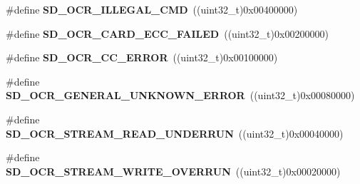 \begin{DoxyCompactItemize}
\item 
\#define {\bfseries S\+D\+\_\+\+O\+C\+R\+\_\+\+I\+L\+L\+E\+G\+A\+L\+\_\+\+C\+MD}~((uint32\+\_\+t)0x00400000)\hypertarget{group___s_t_m324x_g___e_v_a_l___s_d_i_o___s_d___private___defines_gaacbea47f6b504f11a696e9164d4eb7cd}{}\label{group___s_t_m324x_g___e_v_a_l___s_d_i_o___s_d___private___defines_gaacbea47f6b504f11a696e9164d4eb7cd}

\item 
\#define {\bfseries S\+D\+\_\+\+O\+C\+R\+\_\+\+C\+A\+R\+D\+\_\+\+E\+C\+C\+\_\+\+F\+A\+I\+L\+ED}~((uint32\+\_\+t)0x00200000)\hypertarget{group___s_t_m324x_g___e_v_a_l___s_d_i_o___s_d___private___defines_ga1631f9e745f1f6c1ded6fba841a05a3d}{}\label{group___s_t_m324x_g___e_v_a_l___s_d_i_o___s_d___private___defines_ga1631f9e745f1f6c1ded6fba841a05a3d}

\item 
\#define {\bfseries S\+D\+\_\+\+O\+C\+R\+\_\+\+C\+C\+\_\+\+E\+R\+R\+OR}~((uint32\+\_\+t)0x00100000)\hypertarget{group___s_t_m324x_g___e_v_a_l___s_d_i_o___s_d___private___defines_ga3530c6edf8d326b2d72a8a7fb488957b}{}\label{group___s_t_m324x_g___e_v_a_l___s_d_i_o___s_d___private___defines_ga3530c6edf8d326b2d72a8a7fb488957b}

\item 
\#define {\bfseries S\+D\+\_\+\+O\+C\+R\+\_\+\+G\+E\+N\+E\+R\+A\+L\+\_\+\+U\+N\+K\+N\+O\+W\+N\+\_\+\+E\+R\+R\+OR}~((uint32\+\_\+t)0x00080000)\hypertarget{group___s_t_m324x_g___e_v_a_l___s_d_i_o___s_d___private___defines_ga11edb9b3be6266ffb00b9a507e3b9fff}{}\label{group___s_t_m324x_g___e_v_a_l___s_d_i_o___s_d___private___defines_ga11edb9b3be6266ffb00b9a507e3b9fff}

\item 
\#define {\bfseries S\+D\+\_\+\+O\+C\+R\+\_\+\+S\+T\+R\+E\+A\+M\+\_\+\+R\+E\+A\+D\+\_\+\+U\+N\+D\+E\+R\+R\+UN}~((uint32\+\_\+t)0x00040000)\hypertarget{group___s_t_m324x_g___e_v_a_l___s_d_i_o___s_d___private___defines_ga26270305d70e7d17a8bde14c15378bfd}{}\label{group___s_t_m324x_g___e_v_a_l___s_d_i_o___s_d___private___defines_ga26270305d70e7d17a8bde14c15378bfd}

\item 
\#define {\bfseries S\+D\+\_\+\+O\+C\+R\+\_\+\+S\+T\+R\+E\+A\+M\+\_\+\+W\+R\+I\+T\+E\+\_\+\+O\+V\+E\+R\+R\+UN}~((uint32\+\_\+t)0x00020000)\hypertarget{group___s_t_m324x_g___e_v_a_l___s_d_i_o___s_d___private___defines_ga3b9973ae82de6ca9acb76444a9204407}{}\label{group___s_t_m324x_g___e_v_a_l___s_d_i_o___s_d___private___defines_ga3b9973ae82de6ca9acb76444a9204407}


\end{DoxyCompactItemize}

